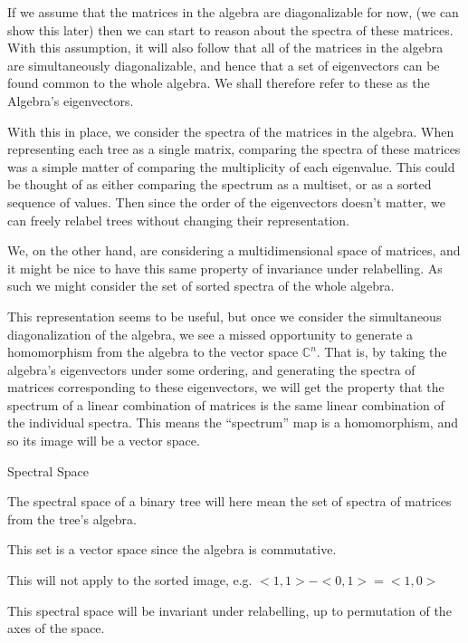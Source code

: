 \documentclass{article}
\begin{document}
If we assume that the matrices in the algebra are diagonalizable for now, (we
can show this later) then we can start to reason about the spectra of these
matrices.
With this assumption, it will also follow that all of the matrices in the
algebra are simultaneously diagonalizable, and hence that a set of eigenvectors
can be found common to the whole algebra.
We shall therefore refer to these as the Algebra's eigenvectors.

With this in place, we consider the spectra of the matrices in the algebra.
When representing each tree as a single matrix, comparing the spectra of these
matrices was a simple matter of comparing the multiplicity of each eigenvalue.
This could be thought of as either comparing the spectrum as a multiset, or as
a sorted sequence of values.
Then since the order of the eigenvectors doesn't matter, we can freely relabel
trees without changing their representation.

We, on the other hand, are considering a multidimensional space of matrices,
and it might be nice to have this same property of invariance under
relabelling.
As such we might consider the set of sorted spectra of the whole algebra.

This representation seems to be useful, but once we consider the simultaneous
diagonalization of the algebra, we see a missed opportunity to generate a
homomorphism from the algebra to the vector space $\mathds{C}^n$.
That is, by taking the algebra's eigenvectors under some ordering, and
generating the spectra of matrices corresponding to these eigenvectors, we will
get the property that the spectrum of a linear combination of matrices is the
same linear combination of the individual spectra.
This means the ``spectrum'' map is a homomorphism, and so its image will be a
vector space.

\begin{definition}Spectral Space

	The spectral space of a binary tree will here mean the set of spectra of
	matrices from the tree's algebra.

	This set is a vector space since the algebra is commutative.
\end{definition}


This will not apply to the sorted image, e.g. $<1, 1> - <0, 1> = <1, 0>$

This spectral space will be invariant under relabelling, up to permutation of
the axes of the space.
\end{document}
